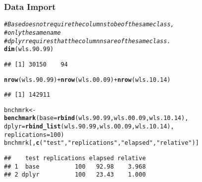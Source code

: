 \documentclass{beamer}\usepackage[]{graphicx}\usepackage[]{color}
\makeatletter
\newcommand{\hlnum}[1]{\textcolor[rgb]{0.686,0.059,0.569}{#1}}%
\newcommand{\hlstr}[1]{\textcolor[rgb]{0.192,0.494,0.8}{#1}}%
\newcommand{\hlcom}[1]{\textcolor[rgb]{0.678,0.584,0.686}{\textit{#1}}}%
\newcommand{\hlopt}[1]{\textcolor[rgb]{0,0,0}{#1}}%
\newcommand{\hlstd}[1]{\textcolor[rgb]{0.345,0.345,0.345}{#1}}%
\newcommand{\hlkwb}[1]{\textcolor[rgb]{0.69,0.353,0.396}{#1}}%
\newcommand{\hlkwc}[1]{\textcolor[rgb]{0.333,0.667,0.333}{#1}}%
\newcommand{\hlkwd}[1]{\textcolor[rgb]{0.737,0.353,0.396}{\textbf{#1}}}%
\newenvironment{kframe}{%
 \def\at@end@of@kframe{}%
 \ifinner\ifhmode%
  \def\at@end@of@kframe{\end{minipage}}%
  \begin{minipage}{\columnwidth}%
 \fi\fi%
 \def\FrameCommand##1{\hskip\@totalleftmargin \hskip-\fboxsep
 \colorbox{shadecolor}{##1}\hskip-\fboxsep
     \hskip-\linewidth \hskip-\@totalleftmargin \hskip\columnwidth}%
 \MakeFramed {\advance\hsize-\width
   \@totalleftmargin\z@ \linewidth\hsize
   \@setminipage}}%
 {\par\unskip\endMakeFramed%
 \at@end@of@kframe}
\newenvironment{knitrout}{}{} %
\makeatother
\begin{document}
\begin{frame}[fragile]
  \frametitle{Data Import}
\begin{knitrout}\footnotesize
{}\color{fgcolor}\begin{kframe}
\begin{alltt}
\hlcom{# Base does not require the columns to be of the same class,}
\hlcom{# only the same name}
\hlcom{# dplyr requires that the columnns are of the same class.}
\hlkwd{dim}\hlstd{(wls.90.99)}
\end{alltt}
\begin{verbatim}
## [1] 30150    94
\end{verbatim}
\begin{alltt}
\hlkwd{nrow}\hlstd{(wls.90.99)} \hlopt{+} \hlkwd{nrow}\hlstd{(wls.00.09)} \hlopt{+} \hlkwd{nrow}\hlstd{(wls.10.14)}
\end{alltt}
\begin{verbatim}
## [1] 142911
\end{verbatim}
\begin{alltt}
\hlstd{bnchmrk} \hlkwb{<-}
  \hlkwd{benchmark}\hlstd{(}\hlkwc{base} \hlstd{=} \hlkwd{rbind}\hlstd{(wls.90.99, wls.00.09, wls.10.14),}
            \hlkwc{dplyr} \hlstd{=} \hlkwd{rbind_list}\hlstd{(wls.90.99, wls.00.09, wls.10.14),}
            \hlkwc{replications} \hlstd{=} \hlnum{100}\hlstd{)}
\hlstd{bnchmrk[,} \hlkwd{c}\hlstd{(}\hlstr{"test"}\hlstd{,} \hlstr{"replications"}\hlstd{,} \hlstr{"elapsed"}\hlstd{,} \hlstr{"relative"}\hlstd{)]}
\end{alltt}
\begin{verbatim}
##    test replications elapsed relative
## 1  base          100   92.98    3.968
## 2 dplyr          100   23.43    1.000
\end{verbatim}
\end{kframe}
\end{knitrout}
\end{frame} 
\end{document}
